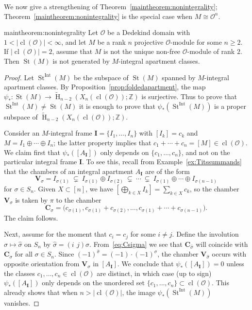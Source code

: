 \documentclass[11 pt]{article}
\newenvironment{theorem-prime}[1]{\renewcommand\theinnerthm{\ref*{#1}$'$}\innerthm}{\endinnerthm}
\theoremstyle{plain}
\theoremstyle{definition}
\numberwithin{equation}{section}
\newcommand\Z{\ensuremath{\mathbb{Z}}}
\DeclareMathOperator{\HH}{H}
\renewcommand{\O}{\mathcal{O}}
\DeclareMathOperator{\class}{cl}
\DeclareMathOperator{\St}{St}
\newcommand\II{\mathbf{I}}
\newcommand\VV{\mathbf{V}}
\newcommand\CC{\mathbf{C}}
\newcommand\abs[1]{\left\lvert#1\right\rvert}
\DeclareMathOperator{\Int}{Int}
\newcommand\iso{\cong}
\begin{document}
\noindent We now give a strengthening of Theorem~\ref{maintheorem:nonintegrality}; 
Theorem~\ref{maintheorem:nonintegrality} is the special case when $M\iso \O^n$. %
\begin{theorem-prime}{maintheorem:nonintegrality}
\label{thm:nonintegralitystronger}
Let $\O$ be a Dedekind domain with $1<\abs{\class(\O)}<\infty$, and let $M$ be a rank $n$ projective $\O$-module for some $n\geq 2$. If $\abs{\class(\O)}=2$, assume that $M$ is not the unique non-free $\O$-module of rank $2$. Then $\St(M)$ is not generated by $M$-integral apartment classes.
\end{theorem-prime}
\begin{proof}
Let $\St^{\Int}(M)$ be the subspace of $\St(M)$ spanned by $M$-integral 
apartment classes. By Proposition~\ref{prop:foldedapartment}, the map 
$\psi_{\ast}\colon \St(M) \rightarrow \widetilde{\HH}_{n-2}(X_n(\class(\O));\Z)$ is surjective.  Thus to prove that $\St^{\Int}(M)\neq \St(M)$ it is enough to prove that $\psi_{\ast}(\St^{\Int}(M))$ is a proper subspace of
$\widetilde{\HH}_{n-2}(X_n(\class(\O));\Z)$.

Consider an $M$-integral frame $\II=\{I_1,\ldots,I_n\}$ with $[I_k]=c_k$ and $M=I_1\oplus\cdots\oplus I_n$; the latter property implies that 
$c_1+\cdots+c_n=[M]\in \class(\O)$.  We claim first that $\psi_{\ast}([A_{\II}])$ only depends on $\{c_1,\ldots,c_n\}$, 
and not on the particular integral frame $\II$.  To see this, recall from Example~\ref{ex:Titssummands} that the chambers of an integral apartment $A_{\II}$ are of the form
\[\VV_\sigma=I_{\sigma(1)}\ \subsetneq\  I_{\sigma(1)}\oplus I_{\sigma(2)}\ \subsetneq
\ \cdots\ \subsetneq\  I_{\sigma(1)}\oplus\cdots\oplus I_{\sigma(n-1)}\] 
for $\sigma\in S_n$.  Given $X\subset [n]$, we have $[\bigoplus_{k\in X} I_k]=\sum_{k\in X} c_k$, so the chamber 
$\VV_\sigma$ is taken by $\pi$ to the chamber
\begin{equation}
\label{eq:Csigma}
\CC_\sigma= \big(c_{\sigma(1)},c_{\sigma(1)}+c_{\sigma(2)},\ldots,c_{\sigma(1)}+\cdots+c_{\sigma(n-1)}\big).
\end{equation}
The claim follows.

Next, assume for the moment that $c_i=c_j$ for some $i \neq j$.  Define the 
involution $\sigma\mapsto \widehat{\sigma}$ on $S_n$ by 
$\widehat{\sigma}=(i\ \,j) \sigma$.   From~\eqref{eq:Csigma} we see that 
$\CC_{\widehat{\sigma}}$ will coincide with $\CC_{\sigma}$ for all 
$\sigma\in S_n$.  Since $(-1)^{\widehat{\sigma}}=(-1)\cdot (-1)^{\sigma}$, the 
chamber $\VV_{\widehat{\sigma}}$ occurs with opposite orientation from 
$\VV_\sigma$ in $[A_{\II}]$.  We conclude that $\psi_{\ast}([A_{\II}])=0$ 
unless the classes $c_1,\ldots,c_n\in \class(\O)$ are distinct, in which case
(up to sign) $\psi_{\ast}([A_{\II}])$ only depends on the unordered set
$\{c_1,\ldots,c_n\} \subset \class(\O)$.
This already shows that when $n>\abs{\class(\O)}$, the image
$\psi_{\ast}(\St^{\Int}(M))$ vanishes.


\end{proof}
\end{document}
